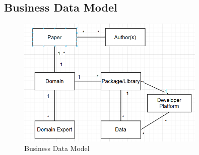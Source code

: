 \documentclass[12pt]{article}
\begin{document}
\subsection{Business Data Model}
\begin{figure}[h!]
  \centering
  \includegraphics[width=0.8\textwidth]{BusinessDataModel.png}
  \caption{Business Data Model}
  \label{fig:business-data-model}
\end{figure}
\end{document}
